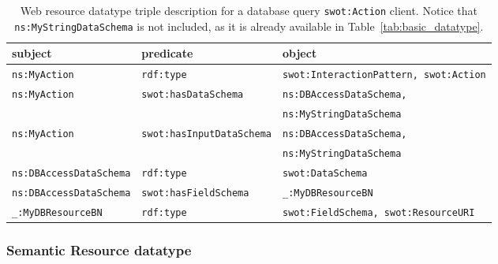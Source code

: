 \begin{table*}[t]
\centering
\footnotesize
\caption{Web resource datatype triple description for a database query \texttt{swot:Action} client. Notice that \texttt{ns:MyStringDataSchema} is not included, as it is already available in Table~\ref{tab:basic_datatype}.}
\label{tab:db_resource_datatype}
\begin{tabular}{lll}
\textbf{subject}           & \textbf{predicate}           & \textbf{object}           \\ \hline
\texttt{ns:MyAction}       & \texttt{rdf:type}            & \texttt{swot:InteractionPattern, swot:Action}  \\ \hline
\texttt{ns:MyAction}       & \texttt{swot:hasDataSchema}   & \texttt{ns:DBAccessDataSchema,} \\
&  & \texttt{ns:MyStringDataSchema} \\ \hline
\texttt{ns:MyAction}       & \texttt{swot:hasInputDataSchema} & \texttt{ns:DBAccessDataSchema,}  \\
&  & \texttt{ns:MyStringDataSchema}  \\ \hline
\texttt{ns:DBAccessDataSchema}& \texttt{rdf:type}            & \texttt{swot:DataSchema}   \\ \hline
\texttt{ns:DBAccessDataSchema}& \texttt{swot:hasFieldSchema}  & \texttt{\_:MyDBResourceBN} \\ \hline
\texttt{\_:MyDBResourceBN} & \texttt{rdf:type}        & \texttt{swot:FieldSchema, swot:ResourceURI}\\ \hline
\end{tabular}
\end{table*}

\subsubsection{\textsf{Semantic Resource datatype}}

